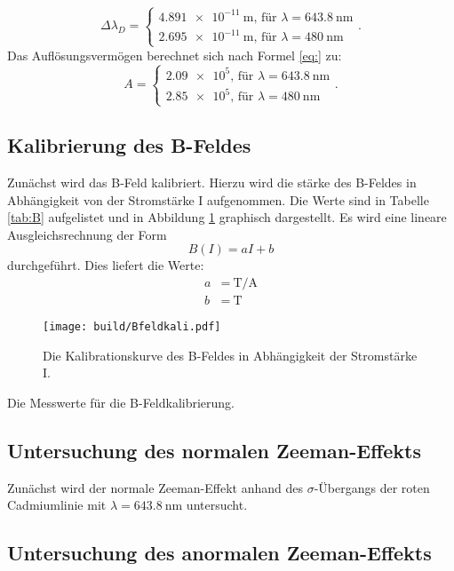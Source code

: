 \[
\Delta\lambda_D =
\begin{cases}
\SI{4.891e-11}{\metre} \text{, für }\lambda=\SI{643.8}{\nano\metre}\\
\SI{2.695e-11}{\metre} \text{, für }\lambda=\SI{480}{\nano\metre}
\end{cases}\text{.}
\]
Das Auflösungsvermögen berechnet sich nach Formel \eqref{eq:} zu:
\[
A = 
\begin{cases}
\num{2.09e5} \text{, für }\lambda=\SI{643.8}{\nano\metre}\\
\num{2.85e5} \text{, für }\lambda=\SI{480}{\nano\metre}
\end{cases}\text{.}
\]

\subsection{Kalibrierung des B-Feldes}

Zunächst wird das B-Feld kalibriert. Hierzu wird die stärke des B-Feldes in Abhängigkeit von der Stromstärke I aufgenommen. Die Werte sind in Tabelle \ref{tab:B} aufgelistet und in Abbildung \ref{fig:B} graphisch dargestellt. Es wird eine lineare Ausgleichsrechnung der Form
\[
B(I) = aI+b
\]
durchgeführt. Dies liefert die Werte:
\begin{align*}
a &= \SI{}{\tesla\per\ampere}\\
b &= \SI{}{\tesla}
\end{align*}

\begin{figure}
	\centering
	\texttt{[image: build/Bfeldkali.pdf]}
	\caption{Die Kalibrationskurve des B-Feldes in Abhängigkeit der Stromstärke I.}
	\label{fig:B}
\end{figure}

\begin{table}
	\centering
	\caption{Die Messwerte für die B-Feldkalibrierung.}
	
	\label{tab:B}
\end{table}

\subsection{Untersuchung des normalen Zeeman-Effekts}

Zunächst wird der normale Zeeman-Effekt anhand des $\sigma$-Übergangs der roten Cadmiumlinie mit $\lambda=\SI{643.8}{\nano\metre}$ untersucht. 

\subsection{Untersuchung des anormalen Zeeman-Effekts}